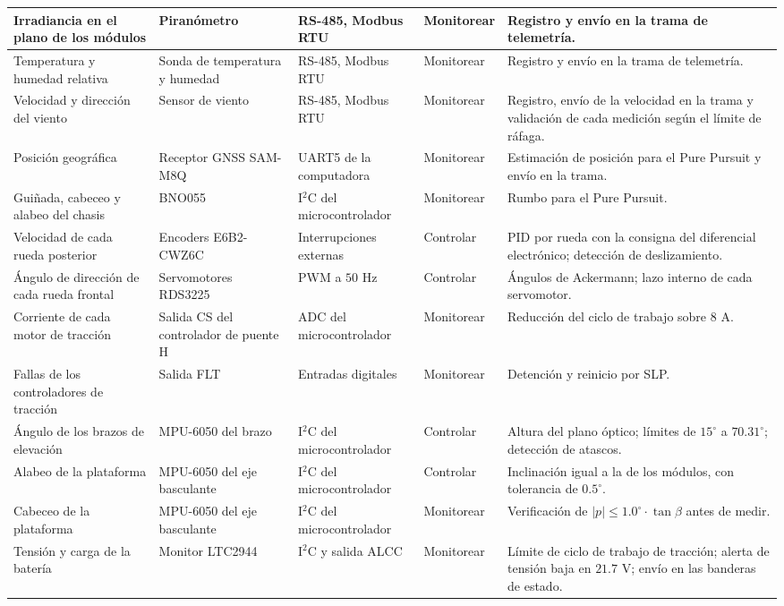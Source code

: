 \documentclass[../../General.tex]{subfiles}
\begin{document}
\begin{center}
\begin{xltabular}{\textwidth}{|p{2.8cm}|p{2.6cm}|p{2.4cm}|>{\centering\arraybackslash}p{2.0cm}|>{\raggedright\arraybackslash}X|}
        Irradiancia en el plano de los módulos & Piranómetro & RS-485, Modbus RTU & Monitorear & Registro y envío en la trama de telemetría. \\ \hline
        Temperatura y humedad relativa & Sonda de temperatura y humedad & RS-485, Modbus RTU & Monitorear & Registro y envío en la trama de telemetría. \\ \hline
        Velocidad y dirección del viento & Sensor de viento & RS-485, Modbus RTU & Monitorear & Registro, envío de la velocidad en la trama y validación de cada medición según el límite de ráfaga. \\ \hline
        Posición geográfica & Receptor GNSS SAM-M8Q & UART5 de la computadora & Monitorear & Estimación de posición para el Pure Pursuit y envío en la trama. \\ \hline
        Guiñada, cabeceo y alabeo del chasis & BNO055 & I$^2$C del microcontrolador & Monitorear & Rumbo para el Pure Pursuit. \\ \hline
        Velocidad de cada rueda posterior & Encoders E6B2-CWZ6C & Interrupciones externas & Controlar & PID por rueda con la consigna del diferencial electrónico; detección de deslizamiento. \\ \hline
        Ángulo de dirección de cada rueda frontal & Servomotores RDS3225 & PWM a $50\text{ Hz}$ & Controlar & Ángulos de Ackermann; lazo interno de cada servomotor. \\ \hline
        Corriente de cada motor de tracción & Salida CS del controlador de puente H & ADC del microcontrolador & Monitorear & Reducción del ciclo de trabajo sobre $8\text{ A}$. \\ \hline
        Fallas de los controladores de tracción & Salida FLT & Entradas digitales & Monitorear & Detención y reinicio por SLP. \\ \hline
        Ángulo de los brazos de elevación & MPU-6050 del brazo & I$^2$C del microcontrolador & Controlar & Altura del plano óptico; límites de $15^\circ$ a $70.31^\circ$; detección de atascos. \\ \hline
        Alabeo de la plataforma & MPU-6050 del eje basculante & I$^2$C del microcontrolador & Controlar & Inclinación igual a la de los módulos, con tolerancia de $0.5^\circ$. \\ \hline
        Cabeceo de la plataforma & MPU-6050 del eje basculante & I$^2$C del microcontrolador & Monitorear & Verificación de $|p| \leq 1.0^\circ \cdot \tan\beta$ antes de medir. \\ \hline
        Tensión y carga de la batería & Monitor LTC2944 & I$^2$C y salida ALCC & Monitorear & Límite de ciclo de trabajo de tracción; alerta de tensión baja en $21.7\text{ V}$; envío en las banderas de estado. \\ \hline

\end{xltabular}
\end{center}
\end{document}
